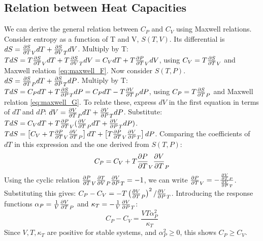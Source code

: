 \documentclass[10pt, letterpaper]{article}
\begin{document}
\subsection{Relation between Heat Capacities}
We can derive the general relation between $C_P$ and $C_V$ using Maxwell relations.
Consider entropy as a function of T and V, $S(T, V)$. Its differential is $dS = \pdv{S}{T}_{V} dT + \pdv{S}{V}_{T} dV$.
Multiply by T: $T dS = T \pdv{S}{T}_{V} dT + T \pdv{S}{V}_{T} dV = C_V dT + T \pdv{P}{T}_{V} dV$, using $C_V = T\pdv{S}{T}_V$ and Maxwell relation \eqref{eq:maxwell_F}.
Now consider $S(T, P)$. $dS = \pdv{S}{T}_{P} dT + \pdv{S}{P}_{T} dP$.
Multiply by T: $T dS = C_P dT + T \pdv{S}{P}_{T} dP = C_P dT - T \pdv{V}{T}_{P} dP$, using $C_P = T\pdv{S}{T}_P$ and Maxwell relation \eqref{eq:maxwell_G}.
To relate these, express $dV$ in the first equation in terms of $dT$ and $dP$: $dV = \pdv{V}{T}_{P} dT + \pdv{V}{P}_{T} dP$.
Substitute: $T dS = C_V dT + T \pdv{P}{T}_{V} (\pdv{V}{T}_{P} dT + \pdv{V}{P}_{T} dP)$.
$T dS = \left[ C_V + T \pdv{P}{T}_{V} \pdv{V}{T}_{P} \right] dT + \left[ T \pdv{P}{T}_{V} \pdv{V}{P}_{T} \right] dP$.
Comparing the coefficients of $dT$ in this expression and the one derived from $S(T, P)$:
\begin{equation*}
    C_P = C_V + T \pdv{P}{T}_{V} \pdv{V}{T}_{P}
\end{equation*}
Using the cyclic relation $\pdv{P}{T}_{V} \pdv{T}{V}_{P} \pdv{V}{P}_{T} = -1$, we can write $\pdv{P}{T}_{V} = - \frac{\pdv{V}{T}_{P}}{\pdv{V}{P}_{T}}$.
Substituting this gives: $C_P - C_V = -T \left(\pdv{V}{T}_{P}\right)^2 / \pdv{V}{P}_{T}$.
Introducing the response functions $\alpha_P = \frac{1}{V}\pdv{V}{T}_{P}$ and $\kappa_T = -\frac{1}{V}\pdv{V}{P}_{T}$:
\begin{equation}
    C_P - C_V = \frac{V T \alpha_P^2}{\kappa_T}
\end{equation}
Since $V, T, \kappa_T$ are positive for stable systems, and $\alpha_P^2 \ge 0$, this shows $C_P \ge C_V$.
\end{document}

